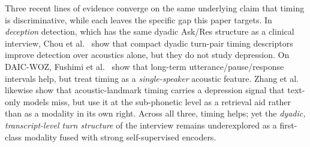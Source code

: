 \documentclass{article}
\begin{document}
Three recent lines of evidence converge on the same underlying claim that timing is discriminative, while each leaves the specific gap this paper targets. 
In \emph{deception} detection, which has the same dyadic Ask/Res structure as a clinical interview, Chou et al.~\cite{chou2019joint,chou2021automatic} show that compact dyadic turn-pair timing descriptors improve detection over acoustics alone, but they do not study depression. 
On DAIC-WOZ, Fushimi et al.~\cite{fushimi2026beyond} show that long-term utterance/pause/response intervals help, but treat timing as a \emph{single-speaker} acoustic feature. 
Zhang et al.~\cite{zhang2025speechtrag,zhang2024llms} likewise show that acoustic-landmark timing carries a depression signal that text-only models miss, but use it at the sub-phonetic level as a retrieval aid rather than as a modality in its own right. 
Across all three, timing helps; yet the \emph{dyadic, transcript-level turn structure} of the interview remains underexplored as a first-class modality fused with strong self-supervised encoders.
\end{document}
